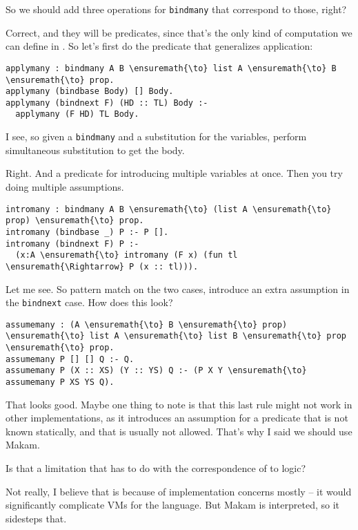 \heroSTUDENT{} So we should add three operations for \texttt{bindmany} that
correspond to those, right?

\heroADVISOR{} Correct, and they will be predicates, since that's the only
kind of computation we can define in \lamprolog{}. So let's first do the
predicate that generalizes application:

\begin{verbatim}
applymany : bindmany A B \ensuremath{\to} list A \ensuremath{\to} B \ensuremath{\to} prop.
applymany (bindbase Body) [] Body.
applymany (bindnext F) (HD :: TL) Body :-
  applymany (F HD) TL Body.
\end{verbatim}

\heroSTUDENT{} I see, so given a \texttt{bindmany} and a substitution for the
variables, perform simultaneous substitution to get the body.

\heroADVISOR{} Right. And a predicate for introducing multiple variables at
once. Then you try doing multiple assumptions.

\begin{verbatim}
intromany : bindmany A B \ensuremath{\to} (list A \ensuremath{\to} prop) \ensuremath{\to} prop.
intromany (bindbase _) P :- P [].
intromany (bindnext F) P :-
  (x:A \ensuremath{\to} intromany (F x) (fun tl \ensuremath{\Rightarrow} P (x :: tl))).
\end{verbatim}

\heroSTUDENT{} Let me see. So pattern match on the two cases, introduce an
extra assumption in the \texttt{bindnext} case. How does this look?

\begin{verbatim}
assumemany : (A \ensuremath{\to} B \ensuremath{\to} prop) \ensuremath{\to} list A \ensuremath{\to} list B \ensuremath{\to} prop \ensuremath{\to} prop.
assumemany P [] [] Q :- Q.
assumemany P (X :: XS) (Y :: YS) Q :- (P X Y \ensuremath{\to} assumemany P XS YS Q).
\end{verbatim}

\heroADVISOR{} That looks good. Maybe one thing to note is that this last rule
might not work in other \lamprolog implementations, as it introduces an
assumption for a predicate that is not known statically, and that is
usually not allowed. That's why I said we should use Makam.

\heroSTUDENT{} Is that a limitation that has to do with the correspondence of
\lamprolog to logic?

\heroADVISOR{} Not really, I believe that is because of implementation
concerns mostly -- it would significantly complicate VMs for the
language. But Makam is interpreted, so it sidesteps that.

